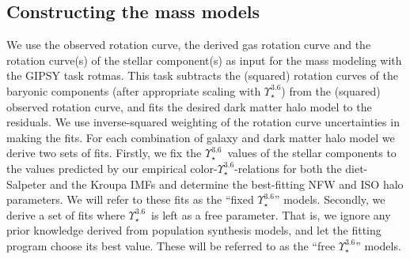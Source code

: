 \documentclass[usenatbib,usegraphicx,apjfonts,floatfix]{emulateapj}
\newcommand{\Ups}{\ensuremath{\Upsilon_{\star}^{3.6}}}
\begin{document}
\subsection{Constructing the mass models}

We use the observed rotation curve, the derived gas rotation curve and
the rotation curve(s) of the stellar component(s) as input for the
mass modeling with the GIPSY task {\sc rotmas}.  This task subtracts
the (squared) rotation curves of the baryonic components (after
appropriate scaling with $\Ups$) from the (squared) observed rotation
curve, and fits the desired dark matter halo model to the
residuals. We use inverse-squared weighting of the rotation curve
uncertainties in making the fits.  For each combination of galaxy and
dark matter halo model we derive two sets of fits.  Firstly, we fix
the \Ups\ values of the stellar components to the values predicted by
our empirical color-\Ups-relations for both the diet-Salpeter and the
Kroupa IMFs and determine the best-fitting NFW and ISO halo
parameters. We will refer to these fits as the ``fixed \Ups'' models.
Secondly, we derive a set of fits where \Ups\ is left as a free
parameter. That is, we ignore any prior knowledge derived from
population synthesis models, and let the fitting program choose its
best value. These will be referred to as the ``free \Ups'' models.


\begin{figure}[t]
\hsize {} 
\end{figure}


\begin{figure}[t]
  \hsize {} 
\end{figure}
\end{document}
